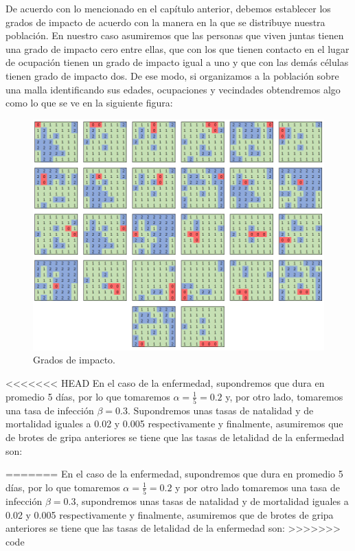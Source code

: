 De acuerdo con lo mencionado en el capítulo anterior, debemos establecer los grados de impacto de acuerdo con la manera en la que se distribuye nuestra población. En nuestro caso asumiremos que las personas que viven juntas tienen una grado de impacto cero entre ellas, que con los que tienen contacto en el lugar de ocupación tienen un grado de impacto igual a uno y que con las demás células tienen grado de impacto dos. De ese modo, si organizamos a la población sobre una malla identificando sus edades, ocupaciones y vecindades obtendremos algo como lo que se ve en la siguiente figura:

\begin{figure}[h]\label{fig:edadesYOcupaciones}
  \centering
    \includegraphics[width=1\textwidth]{Imagenes/vecindadesCap4.PNG}
    \caption{Grados de impacto.}
\end{figure}

<<<<<<< HEAD
En el caso de la enfermedad, supondremos que dura en promedio 5 días, por lo que tomaremos $\alpha=\frac{1}{5}=0.2$ y, por otro lado, tomaremos una tasa de infección $\beta=0.3$. Supondremos unas tasas de natalidad y de mortalidad iguales a 0.02 y 0.005 respectivamente y finalmente, asumiremos que de brotes de gripa anteriores se tiene que las tasas de letalidad de la enfermedad son:

\newpage
=======
En el caso de la enfermedad, supondremos que dura en promedio 5 días, por lo que tomaremos $\alpha=\frac{1}{5}=0.2$ y por otro lado tomaremos una tasa de infección $\beta=0.3$, supondremos unas tasas de natalidad y de mortalidad iguales a 0.02 y 0.005 respectivamente y finalmente, asumiremos que de brotes de gripa anteriores se tiene que las tasas de letalidad de la enfermedad son:
>>>>>>> code

